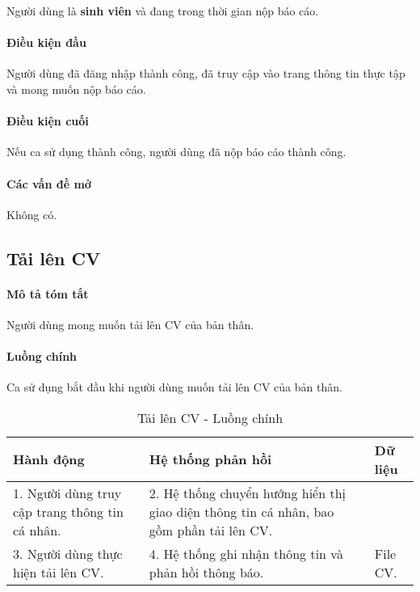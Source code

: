 \documentclass[./../main.tex]{subfiles}
\begin{document}
Người dùng là \textbf{sinh viên} và đang trong thời gian nộp báo cáo.

\paragraph*{Điều kiện đầu}

Người dùng đã đăng nhập thành công, đã truy cập vào trang thông tin thực tập và mong muốn nộp báo cáo.

\paragraph*{Điều kiện cuối}

Nếu ca sử dụng thành công, người dùng đã nộp báo cáo thành công.

\paragraph*{Các vấn đề mở}

Không có.

\subsection{Tải lên CV}

\paragraph*{Mô tả tóm tắt}

Người dùng mong muốn tải lên CV của bản thân.

\paragraph*{Luồng chính} Ca sử dụng bắt đầu khi người dùng muốn tải lên CV của bản thân.

\begin{table}[H]
  \caption{Tải lên CV - Luồng chính}
  \label{tab:upload_cv}
  \begin{tabularx}{\textwidth}{|X|X|X|}
    \hline
    \textbf{Hành động} & \textbf{Hệ thống phản hồi} & \textbf{Dữ liệu} \\ \hline
    1. Người dùng truy cập trang thông tin cá nhân. & 2. Hệ thống chuyển hướng hiển thị giao diện thông tin cá nhân, bao gồm phần tải lên CV. &  \\ \hline
    3. Người dùng thực hiện tải lên CV. & 4. Hệ thống ghi nhận thông tin và phản hồi thông báo. & File CV. \\ \hline
  \end{tabularx}
\end{table}
\end{document}
